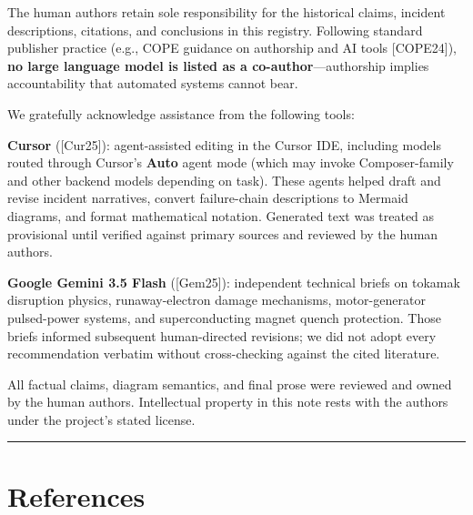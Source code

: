 \documentclass[11pt,a4paper]{article}
\begin{document}
The human authors retain sole responsibility for the historical claims, incident descriptions, citations, and conclusions in this registry. Following standard publisher practice (e.g., COPE guidance on authorship and AI tools {[}COPE24{]}), \textbf{no large language model is listed as a co-author}---authorship implies accountability that automated systems cannot bear.

We gratefully acknowledge assistance from the following tools:

\textbf{Cursor} ({[}Cur25{]}): agent-assisted editing in the Cursor IDE, including models routed through Cursor's \textbf{Auto} agent mode (which may invoke Composer-family and other backend models depending on task). These agents helped draft and revise incident narratives, convert failure-chain descriptions to Mermaid diagrams, and format mathematical notation. Generated text was treated as provisional until verified against primary sources and reviewed by the human authors.

\textbf{Google Gemini 3.5 Flash} ({[}Gem25{]}): independent technical briefs on tokamak disruption physics, runaway-electron damage mechanisms, motor-generator pulsed-power systems, and superconducting magnet quench protection. Those briefs informed subsequent human-directed revisions; we did not adopt every recommendation verbatim without cross-checking against the cited literature.

All factual claims, diagram semantics, and final prose were reviewed and owned by the human authors. Intellectual property in this note rests with the authors under the project's stated license.

\begin{center}\rule{0.5\linewidth}{0.5pt}\end{center}

\hypertarget{references}{%
\section{References}\label{references}}
\end{document}
